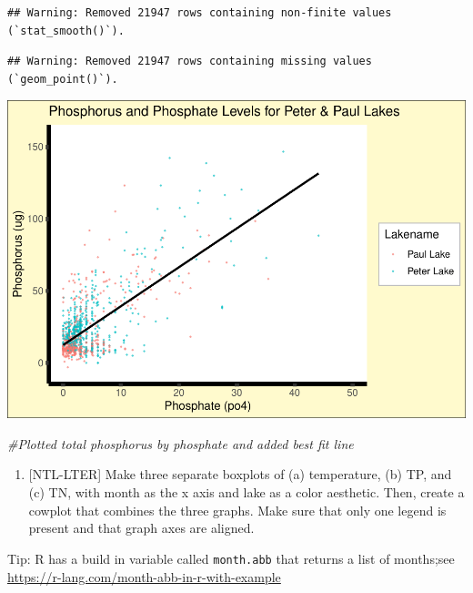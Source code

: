 \documentclass[
]{article}
\newenvironment{Shaded}{\begin{snugshade}}{\end{snugshade}}
\newcommand{\CommentTok}[1]{\textcolor[rgb]{0.56,0.35,0.01}{\textit{#1}}}
\providecommand{\tightlist}{%
  \setlength{\itemsep}{0pt}\setlength{\parskip}{0pt}}
\begin{document}
\begin{verbatim}
## Warning: Removed 21947 rows containing non-finite values (`stat_smooth()`).
\end{verbatim}

\begin{verbatim}
## Warning: Removed 21947 rows containing missing values (`geom_point()`).
\end{verbatim}

\includegraphics{EmmaChilds_A05_DataVisualization_files/figure-latex/plot total P vs PO4-1.pdf}

\begin{Shaded}
\begin{Highlighting}[]
\CommentTok{\#Plotted total phosphorus by phosphate and added best fit line}
\end{Highlighting}
\end{Shaded}

\begin{enumerate}
\def\labelenumi{\arabic{enumi}.}
\setcounter{enumi}{4}
\tightlist
\item
  {[}NTL-LTER{]} Make three separate boxplots of (a) temperature, (b)
  TP, and (c) TN, with month as the x axis and lake as a color
  aesthetic. Then, create a cowplot that combines the three graphs. Make
  sure that only one legend is present and that graph axes are aligned.
\end{enumerate}

Tip: R has a build in variable called \texttt{month.abb} that returns a
list of months;see \url{https://r-lang.com/month-abb-in-r-with-example}
\end{document}
